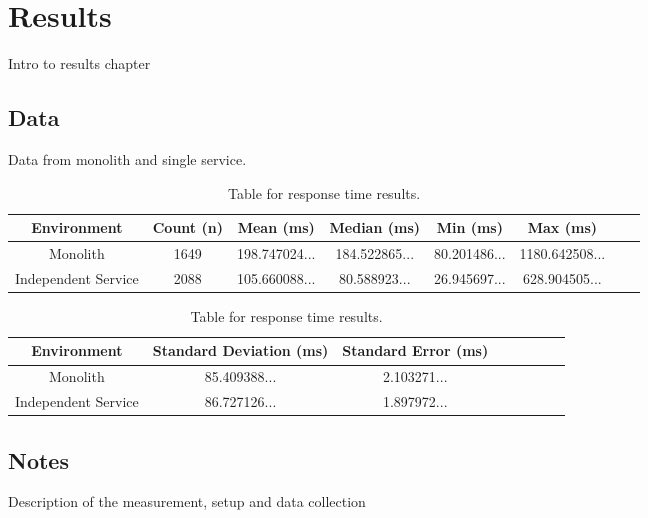 \chapter{Results\label{results}}
Intro to results chapter

\section{Data}
Data from monolith and single service.
\begin{table}[h!]
    \begin{tabular}{|c|c|c|c|c|c|c|c|} 
        \hline
        Environment
        & Count (n)
        & Mean (ms)
        & Median (ms)
        & Min (ms)
        & Max (ms) \\ [0.5ex] 
        
        \hline\hline
        Monolith
        & 1649
        & 198.747024...
        & 184.522865...
        & 80.201486...
        & 1180.642508... \\ 
        
        Independent Service
        & 2088
        & 105.660088...
        & 80.588923...
        & 26.945697...
        & 628.904505... \\
        \hline
    \end{tabular}
    \caption{Table for response time results.}
    \label{table:1}
\end{table}

\begin{table}[h!]
    \begin{tabular}{|c|c|c|c|c|c|c|c|} 
        \hline
        Environment
        & Standard Deviation (ms)
        & Standard Error (ms) \\ [0.5ex] 
        
        \hline\hline
        Monolith
        & 85.409388...
        & 2.103271... \\ 
        
        Independent Service
        & 86.727126...
        & 1.897972... \\ 
         \hline
    \end{tabular}
    \caption{Table for response time results.}
    \label{table:1}
\end{table}


\section{Notes}
Description of the measurement, setup and data collection

